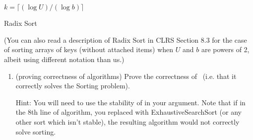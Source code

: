 \documentclass[11pt]{article}
\begin{document}
\begin{enumerate}
\begin{algorithm}[H]
\\
$k=\lceil (\log U)/(\log b)\rceil$\;
\caption{Radix Sort}
\end{algorithm}

(You can also read a description of Radix Sort in CLRS Section 8.3 for the case of sorting arrays of keys (without attached items) when $U$ and $b$ are powers of 2, albeit using different notation than us.)

        \begin{enumerate}
        
            \item (proving correctness of algorithms) Prove the correctness of \RadixSort\ (i.e. that it correctly solves the Sorting problem). 
            
            Hint: You will need to use the stability of \CountingSort in your argument. Note that if in the 8th line of \RadixSort algorithm, you replaced \CountingSort with ExhaustiveSearchSort (or any other sort which isn't stable), the resulting algorithm would not correctly solve sorting. 


\end{enumerate}
\end{enumerate}
\end{document}
